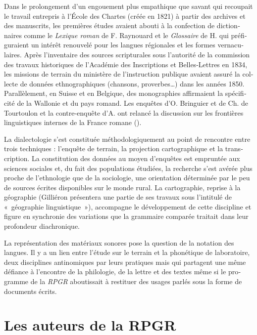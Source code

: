 \documentclass[output=paper]{../langscibook}
\begin{document}
\begin{otherlanguage}{french}
 Dans le prolongement d’un engouement plus empathique que savant qui recoupait le travail entrepris à l’École des Chartes (créée en 1821) à partir des archives et des manuscrits, les premières études avaient abouti à la confection de dictionnaires comme le \textit{Lexique roman} \citeyear{raynouard_lexique_1838} de F. Raynouard et le \textit{Glossaire} de H. \citet{jaubert_glossaire_1856} qui préfiguraient un intérêt renouvelé pour les langues régionales et les formes vernaculaires. Après l’inventaire des sources scripturales sous l’autorité de la commission des travaux historiques de l’Académie des Inscriptions et Belles-Lettres en 1834, les missions de terrain du ministère de l’instruction publique avaient assuré la collecte de données ethnographiques (chansons, proverbes…) dans les années 1850. Parallèlement, en Suisse et en Belgique, des monographies affirmaient la spécificité de la Wallonie et du pays romand. Les enquêtes d’O. Bringuier et de Ch. de Tourtoulon \citeyear{tourtoulon_etude_1876} et la contre-enquête d’A. \citet{thomas_rapport_1879} ont relancé la discussion sur les frontières linguistiques internes de la France romane (\citealt{brun-trigaud_croissant_1990}).

La dialectologie s’est constituée méthodologiquement au point de rencontre entre trois techniques : l’enquête de terrain, la projection cartographique et la transcription. La constitution des données au moyen d’enquêtes est empruntée aux sciences sociales et, du fait des populations étudiées, la recherche s’est avérée plus proche de l’ethnologie que de la sociologie, une orientation déterminée par le peu de sources écrites disponibles sur le monde rural. La cartographie, reprise à la géographie (Gilliéron présentera une partie de ses travaux sous l’intitulé de «~géographie linguistique~»), accompagne le développement de cette discipline et figure en synchronie des variations que la grammaire comparée traitait dans leur profondeur diachronique. 

La représentation des matériaux sonores pose la question de la notation des langues. Il y a un lien entre l’étude sur le terrain et la phonétique de laboratoire, deux disciplines antinomiques par leurs pratiques mais qui partagent une même défiance à l’encontre de la philologie, de la lettre et des textes même si le programme de la \textit{RPGR} aboutissait à restituer des usages parlés sous la forme de documents écrits. 

\section{Les auteurs de la RPGR} 


\end{otherlanguage}
\end{document}
